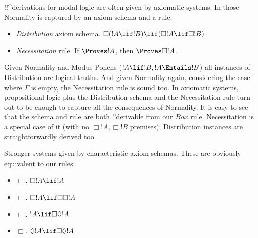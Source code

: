 \documentclass[../../../include/open-logic-section]{subfiles}
\begin{document}


!!^{derivation}s for modal logic are often given by axiomatic systems.
In those Normality is captured by an axiom schema and a rule:
\begin{itemize}
    \item \emph{Distribution} axiom schema. $\Box(!A\lif!B)\lif(\Box!A\lif\Box!B)$.
    \item \emph{Necessitation} rule. If $\Proves!A$, then $\Proves\Box!A$.
\end{itemize}
Given Normality and Modus Ponens ($!A\lif!B,!A\Entails !B$) all
instances of Distribution are logical truths. And given Normality again, 
considering the case where $\Gamma$ is empty, the Necessitation rule
is sound too. In axiomatic systems, propositional logic plus the
Distribution schema and the Necessitation rule turn out to be 
enough to capture all the consequences of Normality. It is easy to see
that the schema and rule are both !!{derivable} 
from our $Box$ rule. Necessitation is a special case of it 
(with no $\Box!A,\Box!B$ premises); Distribution instances are 
straightforwardly derived too.

Stronger systems given by characteristic axiom schemas. These are
obviously equivalent to our rules:
\begin{itemize}
        {. $\Box!A\lif\Diamond!A$}
        { $\Box!A\lif\lnot\Box\lnot!A$} 
    \item $\Box$. $\Box!A\lif!A$
    \item $\Box$. $\Box!A\lif\Box\Box!A$
    \item $\Box$. $!A\lif\Box\Diamond!A$
    \item $\Box$. $\Diamond!A\lif\Box\Diamond!A$
 
\end{itemize}
\end{document}
